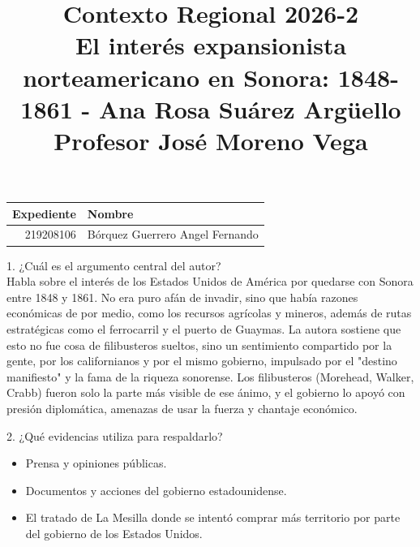 \documentclass[a4paper, 11pt]{article}
\title
{
    Contexto Regional 2026-2 \\
    El interés expansionista norteamericano en Sonora: 1848-1861 - Ana Rosa Suárez Argüello \\

    Profesor José Moreno Vega
}
\begin{document}
\begin{otherlanguage}{spanish}
\maketitle
\end{otherlanguage}

\begin{center}
    \begin{tabular}{r|l}
        \textbf{Expediente} & \textbf{Nombre} \\ \hline
        219208106 & Bórquez Guerrero Angel Fernando \\
    \end{tabular}
\end{center}

{\Large 1. ¿Cuál es el argumento central del autor?} \\
Habla sobre el interés de los Estados Unidos de América por quedarse con Sonora entre 1848 y 1861. No era puro afán de invadir, sino que había razones económicas de por medio, como los recursos agrícolas y mineros, además de rutas estratégicas como el ferrocarril y el puerto de Guaymas. La autora sostiene que esto no fue cosa de filibusteros sueltos, sino un sentimiento compartido por la gente, por los californianos y por el mismo gobierno, impulsado por el "destino manifiesto" y la fama de la riqueza sonorense. Los filibusteros (Morehead, Walker, Crabb) fueron solo la parte más visible de ese ánimo, y el gobierno lo apoyó con presión diplomática, amenazas de usar la fuerza y chantaje económico.\par
\vspace{1cm}

{\Large 2. ¿Qué evidencias utiliza para respaldarlo?} \par
\begin{itemize}
    \item Prensa y opiniones públicas.
    \item Documentos y acciones del gobierno estadounidense.
    \item El tratado de La Mesilla donde se intentó comprar más territorio por parte del gobierno de los Estados Unidos.
\end{itemize}
\end{document}

